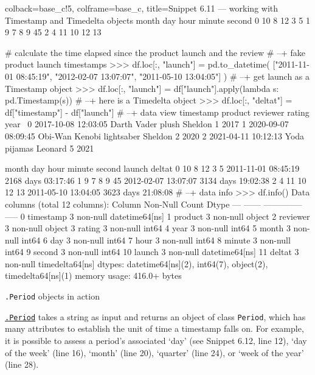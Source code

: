 \documentclass[a4paper,11pt]{book}
\numberwithin{figure}{chapter}
\numberwithin{table}{chapter}
\newcommand{\question}[1]{%
    \begin{tcolorbox}[colback=comp_c!10,colframe=comp_c,sidebyside align=top,width=\linewidth,before skip=1ex]
        #1
    \end{tcolorbox}
    \switchcolumn%
}
\newcommand{\note}[1]{%
    \begin{tcolorbox}[colback=white!0,colframe=white!10,width=\linewidth,before skip=1ex]
        #1
    \end{tcolorbox}
}
\begin{document}
\begin{pythoncode}[linenos=True]{colback=base_c!5, colframe=base_c, title=\sffamily Snippet 6.11 --- working with Timestamp and Timedelta objects}
   month  day  hour  minute  second  
0     10    8    12       3       5  
1      9    7     8       9      45  
2      4   11    10      12      13 

# calculate the time elapsed since the product launch and the review
# --+ fake product launch timestamps 
>>> df.loc[:, "launch"] = pd.to_datetime(
	["2011-11-01 08:45:19", "2012-02-07 13:07:07", "2011-05-10 13:04:05"]
	)
# --+ get launch as a Timestamp object
>>> df.loc[:, "launch"] = df["launch"].apply(lambda s: pd.Timestamp(s))
# --+ here is a Timedelta object
>>> df.loc[:, "deltat"] = df["timestamp"] - df["launch"]
# --+ data view 
            timestamp                    product reviewer  rating  year  \
0 2017-10-08 12:03:05          Darth Vader plush  Sheldon       1  2017   
1 2020-09-07 08:09:45  Obi-Wan Kenobi lightsaber  Sheldon       2  2020   
2 2021-04-11 10:12:13               Yoda pijamas  Leonard       5  2021   

   month  day  hour  minute  second              launch             deltat  
0     10    8    12       3       5 2011-11-01 08:45:19 2168 days 03:17:46  
1      9    7     8       9      45 2012-02-07 13:07:07 3134 days 19:02:38  
2      4   11    10      12      13 2011-05-10 13:04:05 3623 days 21:08:08 
# --+ data info 
>>> df.info()
Data columns (total 12 columns):
     Column     Non-Null Count  Dtype          
---  ------     --------------  -----          
 0   timestamp  3 non-null      datetime64[ns] 
 1   product    3 non-null      object         
 2   reviewer   3 non-null      object         
 3   rating     3 non-null      int64          
 4   year       3 non-null      int64          
 5   month      3 non-null      int64          
 6   day        3 non-null      int64          
 7   hour       3 non-null      int64          
 8   minute     3 non-null      int64          
 9   second     3 non-null      int64          
 10  launch     3 non-null      datetime64[ns] 
 11  deltat     3 non-null      timedelta64[ns]
dtypes: datetime64[ns](2), int64(7), object(2), timedelta64[ns](1)
memory usage: 416.0+ bytes

\end{pythoncode}

\begin{paracol}{2}
	\question{\texttt{.Period} objects in action}
	\note{\href{https://pandas.pydata.org/docs/reference/api/pandas.Period.html}{\texttt{.Period}} takes a string as input and returns an object of class \texttt{Period}, which has many attributes to establish the unit of time a timestamp falls on. For example, it is possible to assess a period's associated `day' (see Snippet 6.12, line 12), `day of the week' (line 16), `month' (line 20), `quarter' (line 24), or `week of the year' (line 28).
	}
\end{paracol}
\end{document}
